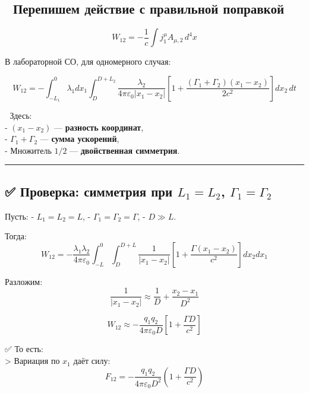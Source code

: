 \documentclass[11pt]{article}
\begin{document}
\subsection{🔁 Перепишем действие с правильной
поправкой}\label{ux43fux435ux440ux435ux43fux438ux448ux435ux43c-ux434ux435ux439ux441ux442ux432ux438ux435-ux441-ux43fux440ux430ux432ux438ux43bux44cux43dux43eux439-ux43fux43eux43fux440ux430ux432ux43aux43eux439}

\[
W_{12} = -\frac{1}{c} \int j_1^\mu A_{\mu,2} \, d^4x
\]

В лабораторной СО, для одномерного случая:

\[
W_{12} = - \int_{-L_1}^0 \lambda_1 dx_1 \int_{D}^{D+L_2} \frac{\lambda_2}{4\pi\varepsilon_0 |x_1 - x_2|} \left[ 1 + \frac{(\Gamma_1 + \Gamma_2)(x_1 - x_2)}{2c^2} \right] dx_2 \, dt
\]

📌 Здесь:\\
- \((x_1 - x_2)\) --- \textbf{разность координат},\\
- \(\Gamma_1 + \Gamma_2\) --- \textbf{сумма ускорений},\\
- Множитель \(1/2\) --- \textbf{двойственная симметрия}.

\begin{center}\rule{0.5\linewidth}{\linethickness}\end{center}

\subsection{\texorpdfstring{✅ Проверка: симметрия при \(L_1 = L_2\),
\(\Gamma_1 = \Gamma_2\)}{✅ Проверка: симметрия при L\_1 = L\_2, \textbackslash{}Gamma\_1 = \textbackslash{}Gamma\_2}}\label{ux43fux440ux43eux432ux435ux440ux43aux430-ux441ux438ux43cux43cux435ux442ux440ux438ux44f-ux43fux440ux438-l_1-l_2-gamma_1-gamma_2}

Пусть: - \(L_1 = L_2 = L\), - \(\Gamma_1 = \Gamma_2 = \Gamma\), -
\(D \gg L\).

Тогда: \[
W_{12} = -\frac{\lambda_1 \lambda_2}{4\pi\varepsilon_0} \int_{-L}^0 \int_{D}^{D+L} \frac{1}{|x_1 - x_2|} \left[ 1 + \frac{\Gamma (x_1 - x_2)}{c^2} \right] dx_2 dx_1
\]

Разложим: \[
\frac{1}{|x_1 - x_2|} \approx \frac{1}{D} + \frac{x_2 - x_1}{D^2}
\]

\[
W_{12} \approx -\frac{q_1 q_2}{4\pi\varepsilon_0 D} \left[ 1 + \frac{\Gamma D}{c^2} \right]
\]

✅ То есть:\\
\textgreater{} Вариация по \(x_1\) даёт силу:\\
\[
F_{12} = -\frac{q_1 q_2}{4\pi\varepsilon_0 D^2} \left( 1 + \frac{\Gamma D}{c^2} \right)
\]
\end{document}
